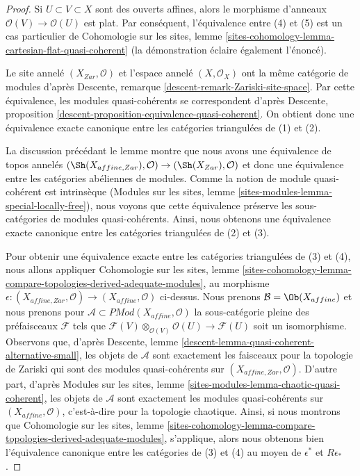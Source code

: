 \begin{proof}
Si $U \subset V \subset X$ sont des ouverts affines, alors le morphisme d'anneaux
$\mathcal{O}(V) \to \mathcal{O}(U)$ est plat. Par conséquent,
l'équivalence entre (4) et (5) est un cas particulier de
Cohomologie sur les sites, lemme
\ref{sites-cohomology-lemma-cartesian-flat-quasi-coherent}
(la démonstration éclaire également l'énoncé).

\medskip\noindent
Le site annelé $(X_{Zar}, \mathcal{O})$ et l'espace annelé
$(X, \mathcal{O}_X)$ ont la même catégorie de modules d'après
Descente, remarque \ref{descent-remark-Zariski-site-space}.
Par cette équivalence, les modules quasi-cohérents se correspondent d'après
Descente, proposition \ref{descent-proposition-equivalence-quasi-coherent}.
On obtient donc une équivalence exacte canonique entre les catégories triangulées
de (1) et (2).

\medskip\noindent
La discussion précédant le lemme montre que nous avons une équivalence de
topos annelés
$(\Sh(X_{affine, Zar}), \mathcal{O}) \to (\Sh(X_{Zar}), \mathcal{O})$
et donc une équivalence entre les catégories abéliennes de modules.
Comme la notion de module quasi-cohérent est intrinsèque
(Modules sur les sites, lemme \ref{sites-modules-lemma-special-locally-free}),
nous voyons que cette équivalence préserve les sous-catégories
de modules quasi-cohérents. Ainsi, nous obtenons une équivalence exacte canonique
entre les catégories triangulées de (2) et (3).

\medskip\noindent
Pour obtenir une équivalence exacte entre les catégories triangulées
de (3) et (4), nous allons appliquer Cohomologie sur les sites, lemme
\ref{sites-cohomology-lemma-compare-topologies-derived-adequate-modules},
au morphisme $\epsilon : (X_{affine, Zar}, \mathcal{O}) \to
(X_{affine}, \mathcal{O})$ ci-dessus. Nous prenons
$\mathcal{B} = \Ob(X_{affine})$ et nous prenons pour
$\mathcal{A} \subset \textit{PMod}(X_{affine}, \mathcal{O})$
la sous-catégorie pleine des préfaisceaux $\mathcal{F}$
tels que $\mathcal{F}(V) \otimes_{\mathcal{O}(V)} \mathcal{O}(U)
\to \mathcal{F}(U)$ soit un isomorphisme. Observons que, d'après
Descente, lemme \ref{descent-lemma-quasi-coherent-alternative-small},
les objets de $\mathcal{A}$ sont exactement les faisceaux pour la topologie de Zariski
qui sont des modules quasi-cohérents sur $(X_{affine, Zar}, \mathcal{O})$.
D'autre part, d'après Modules sur les sites, lemme
\ref{sites-modules-lemma-chaotic-quasi-coherent},
les objets de $\mathcal{A}$ sont exactement les modules quasi-cohérents
sur $(X_{affine}, \mathcal{O})$, c'est-à-dire pour la topologie chaotique.
Ainsi, si nous montrons que Cohomologie sur les sites, lemme
\ref{sites-cohomology-lemma-compare-topologies-derived-adequate-modules},
s'applique, alors nous obtenons bien l'équivalence canonique entre les
catégories de (3) et (4) au moyen de $\epsilon^*$ et $R\epsilon_*$.


\end{proof}
